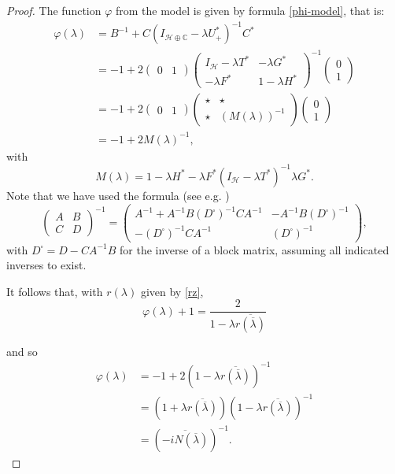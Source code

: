 \documentclass[12pt]{amsart}
\theoremstyle{definition}
\theoremstyle{remark}
\numberwithin{equation}{section}
\begin{document}
\begin{proof}
The function $\varphi$ from the model is given by formula \eqref{phi-model}, that is:
\[
  \begin{split}
\varphi({\lambda})&=B^{-1}+C(I_{\mathcal H\oplus\mathbb C}-{\lambda}U_+^*)^{-1}C^*\\
&=-1+2\begin{pmatrix}0&1\end{pmatrix}\begin{pmatrix}I_{\mathcal H}-{\lambda}T^*&-{\lambda}G^*\\ -{\lambda}F^*&1-{\lambda}H^*\end{pmatrix}^{-1}\begin{pmatrix}0\\ 1\end{pmatrix}\\
&=-1+2\begin{pmatrix}0&1\end{pmatrix}\begin{pmatrix}\star&\star\\ \star&(M({\lambda}))^{-1}\end{pmatrix}\begin{pmatrix}0\\ 1\end{pmatrix}\\
&=-1+2M({\lambda})^{-1},
\end{split}
\]
with
\begin{equation}
  M({\lambda})=1-{\lambda}H^*-{\lambda}F^*(I_{\mathcal H}-{\lambda}T^*)^{-1}{\lambda}G^*.
\end{equation}
Note that we have used the formula (see e.g. \cite[p. 18]{MR1084815})
\[
  \begin{pmatrix}A&B\\ C&D\end{pmatrix}^{-1}=\begin{pmatrix}A^{-1}+A^{-1}B(D^\square)^{-1}CA^{-1}&-A^{-1}B(D^\square)^{-1}\\
        -(D^\square)^{-1}CA^{-1}& (D^\square)^{-1}\end{pmatrix},
    \]
    with $D^\square=D-CA^{-1}B$   for the inverse of a block matrix, assuming all indicated inverses to exist.\smallskip

  It follows that, with $r({\lambda})$ given by \eqref{rz},
  \begin{equation}
\varphi({\lambda})+1=\frac{2}{1-{\lambda}\overline{r(\overline{{\lambda}})}}
\end{equation}

and so
\[
  \begin{split}
    \varphi({\lambda})&=-1+2(1-{\lambda}\overline{r(\overline{{\lambda}})})^{-1}\\
    &=(1+{\lambda}\overline{r(\overline{{\lambda}})})(1-{\lambda}\overline{r(\overline{{\lambda}})})^{-1}\\
    &=\left(\overline{-iN(\overline{{\lambda}})}\right)^{-1}.
    \end{split}
  \]
\end{proof}
\end{document}
